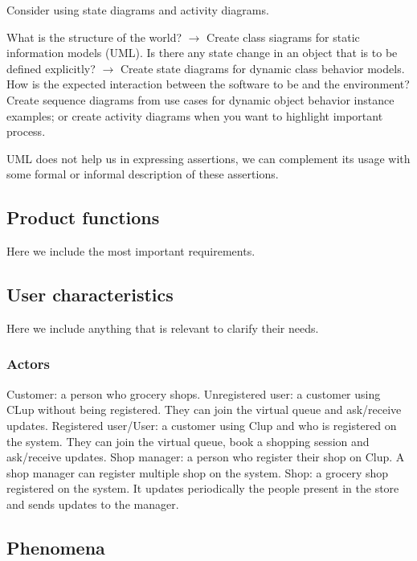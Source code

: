 Consider using state diagrams and activity diagrams.

What is the structure of the world? $\rightarrow$ Create class siagrams for static information models (UML). Is there any state change in an object that is to be defined explicitly? $\rightarrow$ Create state diagrams for dynamic class behavior models. How is the expected interaction between the software to be and the environment? Create sequence diagrams from use cases for dynamic object behavior instance examples; or create activity diagrams when you want to highlight important process.

UML does not help us in expressing assertions, we can complement its usage with some formal or informal description of these assertions.

\subsection{Product functions}
\label{subsect:productfunctions}

Here we include the most important requirements.

\subsection{User characteristics}
\label{subsect:usercharacteristics}

Here we include anything that is relevant to clarify their needs.

\subsubsection{Actors}
\label{subsubsect:actors}

Customer: a person who grocery shops.
Unregistered user: a customer using CLup without being registered. They can join the virtual queue and ask/receive updates.
Registered user/User: a customer using Clup and who is registered on the system. They can join the virtual queue, book a shopping session and ask/receive updates.
Shop manager: a person who register their shop on Clup. A shop manager can register multiple shop on the system.
Shop: a grocery shop registered on the system. It updates periodically the people present in the store and sends updates to the manager.

\subsection{Phenomena}
\label{subsect:phenomena}


